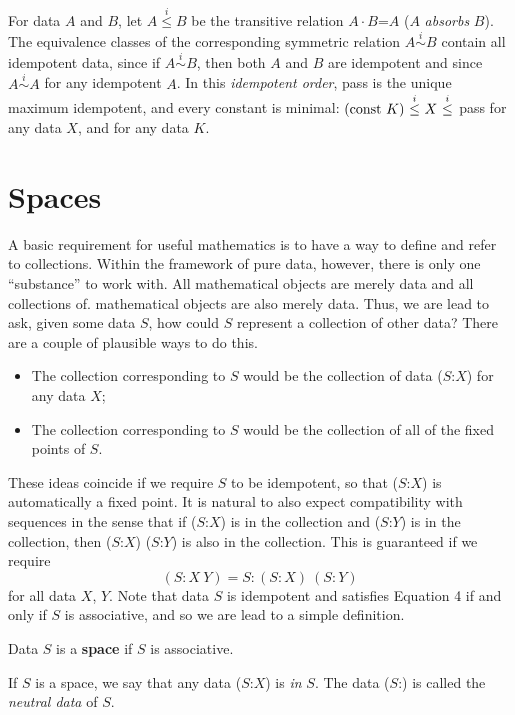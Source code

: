 \documentclass[11pt]{article}
\begin{document}
      For data $A$ and $B$, let $A{\overset i\leq}B$ be the transitive relation $A\cdot B$=$A$ ($A$ {\it absorbs} $B$).  The equivalence classes of the 
corresponding symmetric relation $A{\overset i\sim}B$ contain all idempotent data, since if  $A{\overset i\sim}B$, then both $A$ and $B$ are idempotent and since $A{\overset i\sim}A$ for any idempotent $A$.  In this {\it idempotent order}, pass is the unique maximum idempotent, and every constant 
is minimal: $({\rm const}\ K)\ {\overset i\leq}\ X\ {\overset i\leq}\ $pass for any data $X$,  
and for any data $K$.
 
\section{Spaces}

      A basic requirement for useful mathematics is to have a way to define and refer to collections.  
Within the framework of pure data, however, there is only one ``substance'' to work with.  All mathematical objects are merely data and 
all collections of. mathematical objects are also merely data.  
Thus, we are lead to ask, given some data $S$, how could $S$ represent a collection of other data?  
There are a couple of plausible ways to do this.  
\begin{itemize} 
\item The collection corresponding to $S$ would be the collection of data ($S$:$X$) for any data $X$;
\item The collection corresponding to $S$ would be the collection of all of the fixed points of $S$.  
\end{itemize}
These ideas coincide if we require $S$ to be idempotent, so that ($S$:$X$) is automatically a fixed point.  It is natural to also expect compatibility with 
sequences in the sense that if ($S$:$X$) is in the collection and ($S$:$Y$) is in the collection, then ($S$:$X$) ($S$:$Y$) is also in the collection.  
This is guaranteed if we require 
\begin{equation}
(S : X\ Y) = S : (S:X)\ (S:Y)
\end{equation}
for all data $X$, $Y$.  
Note that data $S$ is idempotent and satisfies Equation 4 if and only if $S$ is associative, and so we are lead 
to a simple definition.
\begin{definition} Data $S$ is a {\bf space} if $S$ is associative.
\end{definition}
\noindent If $S$ is a space, we say that any data ($S$:$X$) is {\it in} $S$.  
The data ($S$:) is called the {\it neutral data} of $S$.  
\end{document}
